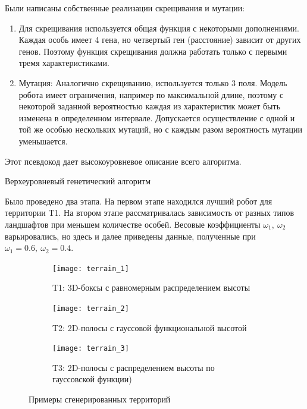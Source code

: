 Были написаны собственные реализации скрещивания и мутации:
\begin{enumerate}
\item Для скрещивания используется общая функция с некоторыми дополнениями. Каждая особь имеет 4 гена, но четвертый ген (расстояние) зависит от других генов. Поэтому функция скрещивания должна работать только с первыми тремя характеристиками.

\item Мутация: Аналогично скрещиванию, используется только 3 поля. Модель робота имеет ограничения, например по максимальной длине, поэтому с некоторой заданной вероятностью каждая из характеристик может быть изменена в определенном интервале. Допускается осуществление с одной и той же особью нескольких мутаций, но с каждым разом вероятность мутации уменьшается. 
\end{enumerate}

Этот псевдокод дает высокоуровневое описание всего алгоритма.

\begin{algorithm}[h]
\caption{Верхеуровневый генетический алгоритм\label{high_level}}
\end{algorithm}

Было проведено два этапа. На первом этапе находился лучший робот для территории T1. На втором этапе рассматривалась зависимость от разных типов ландшафтов при меньшем количестве особей. Весовые коэффициенты $\omega_1,\ \omega_2$ варьировались, но здесь и далее приведены данные, полученные при $\omega_1 = 0.6,\ \omega_2 = 0.4$. 

\begin{figure}[H]
    \begin{subfigure}{0.33\textwidth}
    \centering\texttt{[image: terrain\_1]} 
    \caption{T1: 3D-боксы с равномерным распределением высоты}
    \label{fig:terrain_1}
    \end{subfigure}
    \begin{subfigure}{0.33\textwidth}
    \centering\texttt{[image: terrain\_2]} 
    \caption{T2: 2D-полосы с гауссовой функциональной высотой}
    \label{fig:terrain_2}
    \end{subfigure}
    \begin{subfigure}{0.33\textwidth}
    \centering\texttt{[image: terrain\_3]}
    \caption{T3: 2D-полосы с распределением высоты по гауссовской функции)}
    \label{fig:terrain_3}
    \end{subfigure}
     
    \caption{Примеры сгенерированных территорий}
    \label{fig:terrains}
\end{figure}

